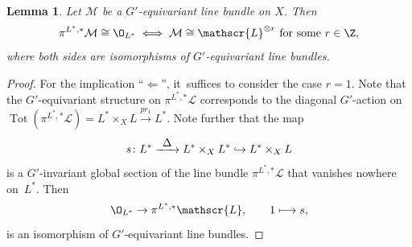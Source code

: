 \documentclass[JEP,XML,SOM,Unicode,published]{cedram}
\newcommand\mto{\mathchoice{\longmapsto}{\mapsto}{\mapsto}{\mapsto}}
\newcommand\hto{\mathrel{\lhook\joinrel\to}}
\newcommand{\To}[1]{\mathchoice{\xrightarrow{\textstyle\kern4pt#1\kern3pt}}{\xrightarrow{\,#1\,}}{}{}}
\newtheorem{lem}[thm]{Lemma}
\newcommand{\Ell}{\mathscr{L}}
\DeclareMathOperator{\Tot}{Tot}
\begin{document}
\begin{lem} \label{lem:invariantSection}
Let $\mathcal M$ be a $G'$-equivariant line bundle on $X$. Then
\[
\pi^{L^*,*} \mathcal M \cong \O_{L^*} \iff \mathcal M \cong \Ell^{\otimes r} \text{ for some $r \in \Z$},
\]
where both sides are isomorphisms of $G'$-equivariant line bundles.
\end{lem}

\begin{proof}
For the implication ``$\Leftarrow$'', it~suffices to consider the case $r = 1$. Note that the $G'$-equivariant structure on $\pi^{L^*,*} \Ell$ corresponds to the diagonal $G'$-action on $\Tot(\pi^{L^*,*} \Ell) = L^* \times_X L \xrightarrow{pr_1} L^*$. Note further that the map
\[
s \colon L^* \To{\Delta} L^* \times_X L^* \hto L^* \times_X L
\]
is a $G'$-invariant global section of the line bundle $\pi^{L^*,*} \Ell$ that vanishes nowhere on~$L^*$. Then
\[
\O_{L^*} \to \pi^{L^*,*} \Ell, \qquad 1 \mto s,
\]
is an isomorphism of $G'$-equivariant line bundles.


\end{proof}
\end{document}
